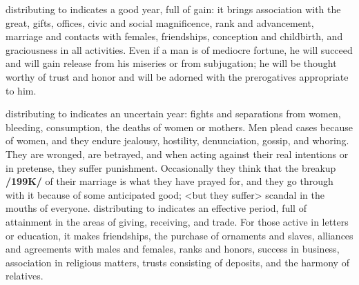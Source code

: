 \Venus\xspace distributing to \Jupiter\xspace indicates a good year, full of gain: it brings association with the great,
gifts, offices, civic and social magnificence, rank and advancement, marriage and contacts with females, friendships, conception and childbirth, and graciousness in all activities. Even if a man is of mediocre fortune, he will succeed and will gain release from his miseries or from subjugation; he will be thought worthy of trust and honor and will be adorned with the prerogatives appropriate to him.

\Venus\xspace distributing to \Mars\xspace indicates an uncertain year: fights and separations from women, bleeding,
consumption, the deaths of women or mothers. Men plead cases because of women, and they endure jealousy, hostility, denunciation, gossip, and whoring. They are wronged, are betrayed, and when acting against their real intentions or in pretense, they suffer punishment. Occasionally they think that the breakup \textbf{/199K/} of their marriage is what they have prayed for, and they go through with it because of some
anticipated good; <but they suffer> scandal in the mouths of everyone.
\enlargethispage{2\baselineskip}
\Venus\xspace distributing to \Mercury\xspace indicates an effective period, full of attainment in the areas of giving,
receiving, and trade. For those active in letters or education, it makes friendships, the purchase of ornaments and slaves, alliances and agreements with males and females, ranks and honors, success in business, association in religious matters, trusts consisting of deposits, and the harmony of relatives.

\newpage